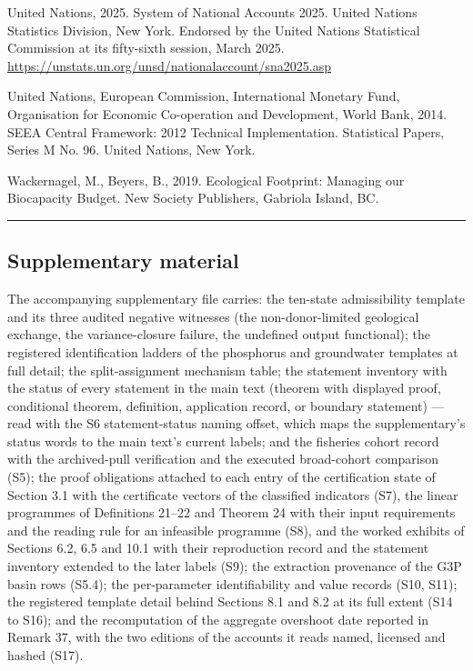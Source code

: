 \documentclass[11pt]{article}
\begin{document}
United Nations, 2025. System of National Accounts 2025. United Nations Statistics Division, New York. Endorsed by the United Nations Statistical Commission at its fifty-sixth session, March 2025. \url{https://unstats.un.org/unsd/nationalaccount/sna2025.asp}

United Nations, European Commission, International Monetary Fund, Organisation for Economic Co-operation and Development, World Bank, 2014. SEEA Central Framework: 2012 Technical Implementation. Statistical Papers, Series M No. 96. United Nations, New York.

Wackernagel, M., Beyers, B., 2019. Ecological Footprint: Managing our
Biocapacity Budget. New Society Publishers, Gabriola Island, BC.

\begin{center}\rule{0.5\linewidth}{0.5pt}\end{center}

\subsection{Supplementary material}\label{supplementary-material}

The accompanying supplementary file carries: the
ten-state admissibility template and its three audited negative
witnesses (the non-donor-limited geological exchange, the
variance-closure failure, the undefined output functional); the
registered identification ladders of the phosphorus and groundwater
templates at full detail; the split-assignment mechanism table; the
statement inventory with the status of every statement in the main text
(theorem with displayed proof, conditional theorem, definition,
application record, or boundary statement) --- read with the S6
statement-status naming offset, which maps the supplementary's status
words to the main text's current labels; and the fisheries cohort record
with the archived-pull verification and the executed broad-cohort
comparison (S5); the proof obligations attached to each entry of the certification state of Section 3.1 with the certificate vectors of the classified indicators (S7), the linear programmes of Definitions 21--22 and Theorem 24 with their input requirements and the reading rule for an infeasible programme (S8), and the worked exhibits of Sections 6.2, 6.5 and 10.1 with their reproduction record and the statement
inventory extended to the later labels (S9); the extraction provenance of the G3P basin rows (S5.4); the
per-parameter identifiability and value records (S10, S11); the registered template detail behind Sections
8.1 and 8.2 at its full extent (S14 to S16); and the recomputation of the aggregate overshoot date reported
in Remark 37, with the two editions of the accounts it reads named, licensed and hashed (S17).
\end{document}
